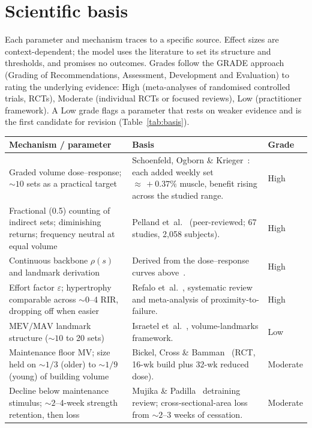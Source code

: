 \documentclass[11pt,a4paper]{article}
\newcommand{\eps}{\varepsilon}
\newcommand{\MV}{\mathrm{MV}}
\newcommand{\MEV}{\mathrm{MEV}}
\newcommand{\MAV}{\mathrm{MAV}}
\begin{document}
\section{Scientific basis}\label{sec:basis}
Each parameter and mechanism traces to a specific source. Effect sizes are context-dependent; the model uses the literature to set its structure and thresholds, and promises no outcomes.
Grades follow the GRADE approach (Grading of Recommendations, Assessment, Development and Evaluation) to rating the underlying evidence: High (meta-analyses of randomised controlled trials, RCTs), Moderate (individual RCTs or focused reviews), Low (practitioner framework). A Low grade flags a parameter that rests on weaker evidence and is the first candidate for revision (Table~\ref{tab:basis}).
\begin{table}[!htb]\centering
\small
\begin{tabular}{@{}p{4.6cm}p{7.8cm}p{1.5cm}@{}}
\toprule
\textbf{Mechanism / parameter} & \textbf{Basis} & \textbf{Grade}\\
\midrule
Graded volume dose--response; ${\sim}10$ sets as a practical target & Schoenfeld, Ogborn \& Krieger~\cite{sch17}: each added weekly set ${\approx}\,{+}0.37\%$ muscle, benefit rising across the studied range. & High\\
Fractional (0.5) counting of indirect sets; diminishing returns; frequency neutral at equal volume & Pelland et~al.~\cite{drr} (peer-reviewed; 67 studies, 2{,}058 subjects). & High\\
Continuous backbone $\rho(s)$ and landmark derivation & Derived from the dose--response curves above~\cite{sch17,drr}. & High\\
Effort factor $\eps$; hypertrophy comparable across ${\sim}0$--4 RIR, dropping off when easier & Refalo et~al.~\cite{failureprox}, systematic review and meta-analysis of proximity-to-failure. & High\\
$\MEV/\MAV$ landmark structure (${\sim}10$ to 20 sets) & Israetel et~al.~\cite{rpvol}, volume-landmarks framework. & Low\\
Maintenance floor $\MV$; size held on ${\sim}1/3$ (older) to ${\sim}1/9$ (young) of building volume & Bickel, Cross \& Bamman~\cite{bickel} (RCT, 16-wk build plus 32-wk reduced dose). & Moderate\\
Decline below maintenance stimulus; ${\sim}2$--4-week strength retention, then loss & Mujika \& Padilla~\cite{mujika} detraining review; cross-sectional-area loss from ${\sim}2$--3 weeks of cessation. & Moderate\\

\end{tabular}
\end{table}
\end{document}
